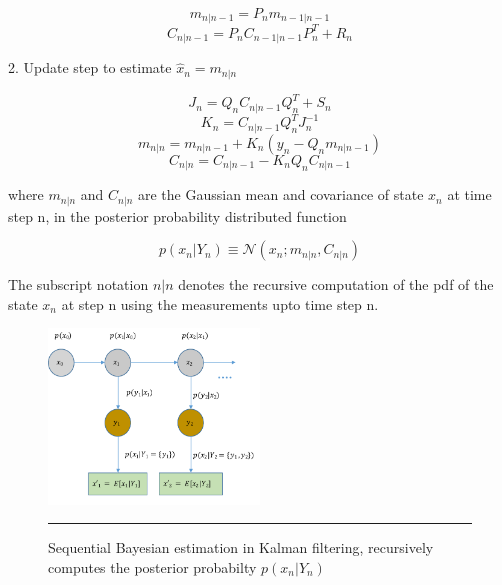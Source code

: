         \begin{equation} m_{n|n-1} = P_{n}m_{n-1|n-1} \end{equation}
        \begin{equation} C_{n|n-1} = P_{n}C_{n-1|n-1}P^{T}_{n} + R_{n} \end{equation}

        2. Update step to estimate $\hat{x}_{n} = m_{n|n}$

        \begin{equation} J_{n} = Q_{n}C_{n|n-1}Q^{T}_{n} + S_{n} \end{equation}
        \begin{equation} K_{n} = C_{n|n-1}Q^{T}_{n}J^{-1}_{n} \end{equation}
        \begin{equation} m_{n|n} = m_{n|n-1} + K_{n}(y_{n} - Q_{n}m_{n|n-1}) \end{equation}
        \begin{equation} C_{n|n} = C_{n|n-1} - K_{n}Q_{n}C_{n|n-1} \end{equation}

where $m_{n|n}$ and $C_{n|n}$ are the Gaussian mean and covariance of state $x_{n}$ at time step n,
in the posterior probability distributed function

        \begin{equation} p(x_{n}|Y_{n}) \equiv \mathcal{N}(x_{n};m_{n|n},C_{n|n}) \end{equation}

The subscript notation $n|n$ denotes the recursive computation of the pdf of the state $x_{n}$ at
step n using the measurements upto time step n.

\begin{figure}[htbp]
  \centering
    \includegraphics[width=0.5\textwidth,height=0.5\textheight,keepaspectratio]{Figures/kalman-filter.pdf}
    \rule{35em}{0.5pt}
  \caption[Sequential Bayesian estimation in Kalman filtering]{Sequential Bayesian estimation in
  Kalman filtering, recursively computes the posterior probabilty $p(x_{n}|Y_{n})$}
  \label{fig:kalman-filter}
\end{figure}

